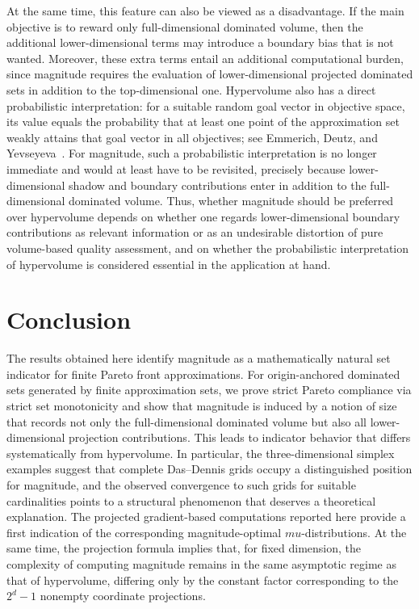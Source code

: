 \documentclass{article}
\def\mu{mu}%
\theoremstyle{definition}
\newcommand{\1}{\mathbf{1}}
\begin{document}
At the same time, this feature can also be viewed as a disadvantage. If the main objective is to reward only full-dimensional dominated volume, then the additional lower-dimensional terms may introduce a boundary bias that is not wanted. Moreover, these extra terms entail an additional computational burden, since magnitude requires the evaluation of lower-dimensional projected dominated sets in addition to the top-dimensional one. Hypervolume also has a direct probabilistic interpretation: for a suitable random goal vector in objective space, its value equals the probability that at least one point of the approximation set weakly attains that goal vector in all objectives; see Emmerich, Deutz, and Yevseyeva~\cite{EmmerichDeutzYevseyeva2014}. For magnitude, such a probabilistic interpretation is no longer immediate and would at least have to be revisited, precisely because lower-dimensional shadow and boundary contributions enter in addition to the full-dimensional dominated volume. Thus, whether magnitude should be preferred over hypervolume depends on whether one regards lower-dimensional boundary contributions as relevant information or as an undesirable distortion of pure volume-based quality assessment, and on whether the probabilistic interpretation of hypervolume is considered essential in the application at hand.

\section{Conclusion}

The results obtained here identify magnitude as a mathematically natural set indicator for finite Pareto front approximations. For origin-anchored dominated sets generated by finite approximation sets, we prove strict Pareto compliance via strict set monotonicity and show that magnitude is induced by a notion of size that records not only the full-dimensional dominated volume but also all lower-dimensional projection contributions. This leads to indicator behavior that differs systematically from hypervolume. In particular, the three-dimensional simplex examples suggest that complete Das--Dennis grids occupy a distinguished position for magnitude, and the observed convergence to such grids for suitable cardinalities points to a structural phenomenon that deserves a theoretical explanation. The projected gradient-based computations reported here provide a first indication of the corresponding magnitude-optimal \(\mu\)-distributions. At the same time, the projection formula implies that, for fixed dimension, the complexity of computing magnitude remains in the same asymptotic regime as that of hypervolume, differing only by the constant factor corresponding to the \(2^d-1\) nonempty coordinate projections.
\end{document}
